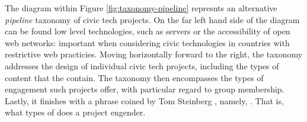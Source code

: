 The diagram within Figure \ref{fig:taxonomy-pipeline} represnts an alternative \emph{pipeline} taxonomy of civic tech projects.
On the far left hand side of the diagram can be found low level technologies, such as servers or the accessibility of open web networks:
important when considering civic technologies in countries with restrictive web practicies.
Moving horizontally forward to the right, the taxonomy addresses the design of individual civic tech projects, including the types of content that the contain.	
The taxonomy then encompasses the types of engagement such projects offer, with particular regard to group membership.
Lastly, it finishes with a phrase coined by Tom Steinberg \cite{tom-steinberg}, namely,  \cite{tom-steinberg-civic-power}. 
That is, what types of  does a project engender.
  